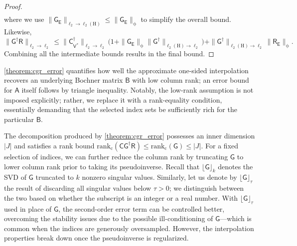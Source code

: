 \documentclass[onefignum,onetabnum]{siamart250211}
\renewenvironment{equation*}{\[}{\]\ignorespacesafterend}
\newcommand{\Hilb}{\mathrm{H}}
\newcommand{\Batrix}[1]{\bm{\Matrix{#1}}}
\newcommand{\Matrix}[1]{\mathsf{#1}}
\newcommand{\pinv}{\dagger}
\newcommand{\Rank}[3][]{\mathrm{rank_{#2}} #1( #3 #1)}
\newcommand{\truncate}[3][]{#1\lfloor #2 #1\rfloor_{#3}}
\newcommand{\Index}[1]{{#1}}
\newcommand{\Norm}[3][]{#1\| #2 #1\|_{\mathrm{#3}}}
\begin{document}
\begin{proof}
\begin{align*}
\end{align*}
where we use $\Norm{\Batrix{G}_{\Batrix{E}}}{\ell_2 \to \ell_2(\Hilb)} \leq \Norm{\Batrix{G}_{\Batrix{E}}}{\phi}$ to simplify the overall bound.
Likewise,
\begin{equation*}
    \Norm{\Batrix{G}^\pinv \Batrix{R}}{\ell_2 \to \ell_2} \leq \Norm{\Matrix{C}_{\Matrix{V}^\ast}^\pinv}{\ell_2 \to \ell_2} \big(1 + \Norm{\Batrix{G}_{\Batrix{E}}}{\phi} \Norm{\Batrix{G}^\pinv}{\ell_2(\Hilb) \to \ell_2} \big) + \Norm{\Batrix{G}^\pinv}{\ell_2(\Hilb) \to \ell_2} \Norm{\Batrix{R}_{\Batrix{E}}}{\phi}.
\end{equation*}
Combining all the intermediate bounds results in the final bound.
\end{proof}

\cref{theorem:cgr_error} quantifies how well the approximate one-sided interpolation recovers an underlying Bochner matrix $\Batrix{B}$ with low column rank; an error bound for $\Batrix{A}$ itself follows by triangle inequality.
Notably, the low-rank assumption is not imposed explicitly; rather, we replace it with a rank-equality condition, essentially demanding that the selected index sets be sufficiently rich for the particular $\Batrix{B}$.

The decomposition produced by \cref{theorem:cgr_error} possesses an inner dimension $|\Index{J}|$ and satisfies a rank bound $\Rank{c}{\Batrix{C} \Batrix{G}^\pinv \Batrix{R}} \leq \Rank{c}{\Batrix{G}} \leq |\Index{J}|$.
For a fixed selection of indices, we can further reduce the column rank by truncating $\Batrix{G}$ to lower column rank prior to taking its pseudoinverse.
Recall that $\truncate{\Batrix{G}}{k}$ denotes the SVD of $\Batrix{G}$ truncated to $k$ nonzero singular values.
Similarly, let us denote by $\truncate{\Batrix{G}}{\tau}$ the result of discarding all singular values below $\tau > 0$; we distinguish between the two based on whether the subscript is an integer or a real number.
With $\truncate{\Batrix{G}}{\tau}$ used in place of $\Batrix{G}$, the second-order error term can be controlled better, overcoming the stability issues due to the possible ill-conditioning of $\Batrix{G}$---which is common when the indices are generously oversampled.
However, the interpolation properties break down once the pseudoinverse is regularized.
\end{document}
